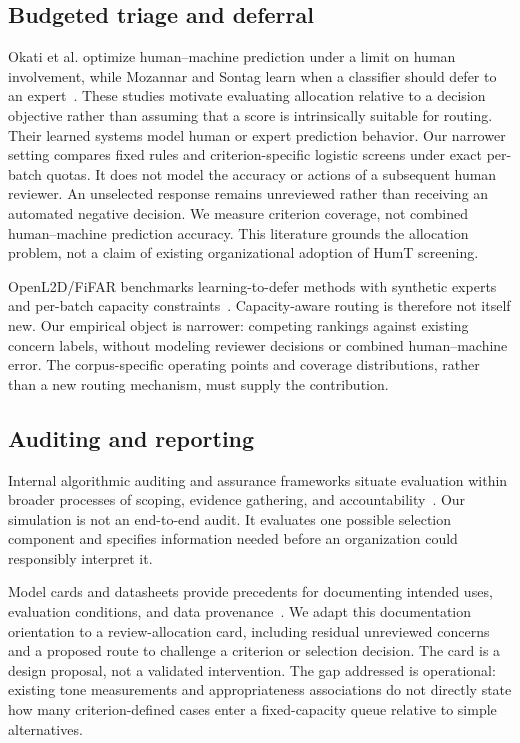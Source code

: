 \documentclass[manuscript,screen,review,anonymous]{acmart}
\begin{document}
\subsection{Budgeted triage and deferral}
Okati et al. optimize human--machine prediction under a limit on human involvement, while Mozannar and Sontag learn when a classifier should defer to an expert~\cite{okati2021triage,mozannar2020defer}. These studies motivate evaluating allocation relative to a decision objective rather than assuming that a score is intrinsically suitable for routing. Their learned systems model human or expert prediction behavior. Our narrower setting compares fixed rules and criterion-specific logistic screens under exact per-batch quotas. It does not model the accuracy or actions of a subsequent human reviewer. An unselected response remains unreviewed rather than receiving an automated negative decision. We measure criterion coverage, not combined human--machine prediction accuracy. This literature grounds the allocation problem, not a claim of existing organizational adoption of HumT screening.

OpenL2D/FiFAR benchmarks learning-to-defer methods with synthetic experts and per-batch capacity constraints~\cite{alves2025openl2d}. Capacity-aware routing is therefore not itself new. Our empirical object is narrower: competing rankings against existing concern labels, without modeling reviewer decisions or combined human--machine error. The corpus-specific operating points and coverage distributions, rather than a new routing mechanism, must supply the contribution.

\subsection{Auditing and reporting}
Internal algorithmic auditing and assurance frameworks situate evaluation within broader processes of scoping, evidence gathering, and accountability~\cite{raji2020accountability,lam2024assurance}. Our simulation is not an end-to-end audit. It evaluates one possible selection component and specifies information needed before an organization could responsibly interpret it.

Model cards and datasheets provide precedents for documenting intended uses, evaluation conditions, and data provenance~\cite{mitchell2019modelcards,gebru2021datasheets}. We adapt this documentation orientation to a review-allocation card, including residual unreviewed concerns and a proposed route to challenge a criterion or selection decision. The card is a design proposal, not a validated intervention. The gap addressed is operational: existing tone measurements and appropriateness associations do not directly state how many criterion-defined cases enter a fixed-capacity queue relative to simple alternatives.
\end{document}
